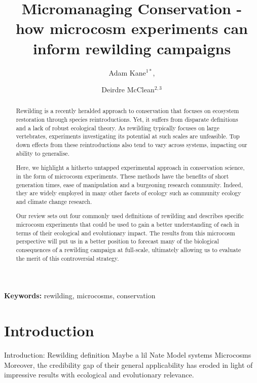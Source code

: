 \documentclass[a4paper,12pt]{article}
\title{Micromanaging Conservation -  \\ 
how microcosm experiments can inform rewilding campaigns}
\author{Adam Kane$^{1*}$, \and Deirdre McClean$^{2,3}$}
\begin{document}
\maketitle


\begin{abstract}
Rewilding is a recently heralded approach to conservation that focuses on ecosystem restoration through species reintroductions. Yet, it suffers from disparate definitions and a lack of robust ecological theory. As rewilding typically focuses on large vertebrates, experiments investigating its potential at such scales are unfeasible. Top down effects from these reintroductions also tend to vary across systems, impacting our ability to generalise. 

Here, we highlight a hitherto untapped experimental approach in conservation science, in the form of microcosm experiments. These methods have the benefits of short generation times, ease of manipulation and a burgeoning research community. Indeed, they are widely employed in many other facets of ecology such as community ecology and climate change research.

Our review sets out four commonly used definitions of rewilding and describes specific microcosm experiments that could be used to gain a better understanding of each in terms of their ecological and evolutionary impact. The results from this microcosm perspective will put us in a better position to forecast many of the biological consequences of a rewilding campaign at full-scale, ultimately allowing us to evaluate the merit of this controversial strategy. 

\end{abstract}

\noindent \textbf{Keywords:} rewilding, microcosms, conservation



\newpage


\section*{Introduction}
Introduction: 
Rewilding definition 
Maybe a lil Nate
Model systems 
Microcosms
Moreover, the credibility gap of their general applicability has eroded in light of impressive results with ecological and evolutionary relevance.
\end{document}
